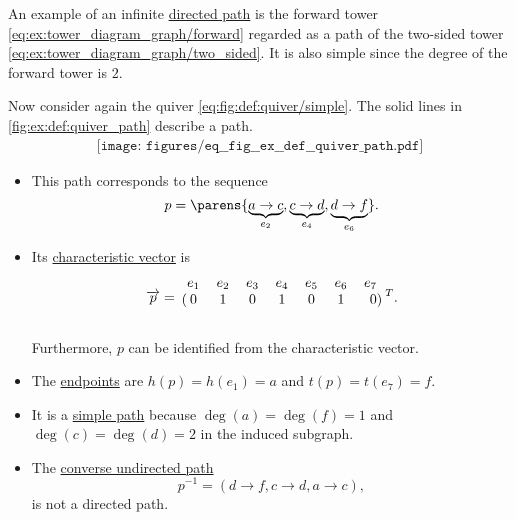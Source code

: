 \begin{example}\label{ex:def:quiver_path}
  An example of an infinite \hyperref[def:quiver_path/directed]{directed path} is the forward tower \eqref{eq:ex:tower_diagram_graph/forward} regarded as a path of the two-sided tower \eqref{eq:ex:tower_diagram_graph/two_sided}. It is also simple since the degree of the forward tower is \( 2 \).

  Now consider again the quiver \eqref{eq:fig:def:quiver/simple}. The solid lines in \eqref{fig:ex:def:quiver_path} describe a path.
  \begin{equation}\label{fig:ex:def:quiver_path}
    \begin{aligned}
      \texttt{[image: figures/eq\_\_fig\_\_ex\_\_def\_\_quiver\_path.pdf]}
    \end{aligned}
  \end{equation}

  \begin{itemize}
    \item This path corresponds to the sequence
    \begin{equation*}
      p = \parens{ \underbrace{a \to c}_{e_2}, \underbrace{c \to d}_{e_4}, \underbrace{d \to f}_{e_6} }.
    \end{equation*}

    \item Its \hyperref[def:undirected_multigraph_path/characteristic_vector]{characteristic vector} is
    \begin{equation*}
      \vect{p}
      =
      \begin{blockarray}{ccccccr}
        e_1 & e_2 & e_3 & e_4 & e_5 & e_6 & e_7 \\
      \begin{block}{(ccccccr)}
        0   & 1   & 0   & 1   & 0   & 1   & 0   \\
      \end{block}
      \end{blockarray}
      {}^T.
    \end{equation*}

    Furthermore, \( p \) can be identified from the characteristic vector.

    \item The \hyperref[def:quiver_path/endpoints]{endpoints} are \( h(p) = h(e_1) = a \) and \( t(p) = t(e_7) = f \).

    \item It is a \hyperref[def:undirected_multigraph_path/simple]{simple path} because \( \deg(a) = \deg(f) = 1 \) and \( \deg(c) = \deg(d) = 2 \) in the induced subgraph.

    \item The \hyperref[def:undirected_multigraph_path/converse]{converse undirected path}
    \begin{equation*}
      p^{-1} = (d \to f, c \to d, a \to c),
    \end{equation*}
    is not a directed path.
  \end{itemize}
\end{example}


